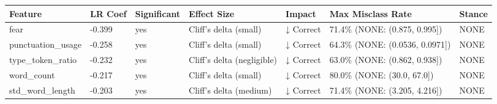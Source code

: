 \begin{tabular}{lllllll}
\toprule
Feature & LR Coef & Significant & Effect Size & Impact & Max Misclass Rate & Stance \\
\midrule
fear & -0.399 & yes & Cliff's delta (small) & ↓ Correct & 71.4\% (NONE: (0.875, 0.995]) & NONE \\
punctuation\_usage & -0.258 & yes & Cliff's delta (small) & ↓ Correct & 64.3\% (NONE: (0.0536, 0.0971]) & NONE \\
type\_token\_ratio & -0.232 & yes & Cliff's delta (negligible) & ↓ Correct & 63.0\% (NONE: (0.862, 0.938]) & NONE \\
word\_count & -0.217 & yes & Cliff's delta (small) & ↓ Correct & 80.0\% (NONE: (30.0, 67.0]) & NONE \\
std\_word\_length & -0.203 & yes & Cliff's delta (medium) & ↓ Correct & 71.4\% (NONE: (3.205, 4.216]) & NONE \\
\bottomrule
\end{tabular}
